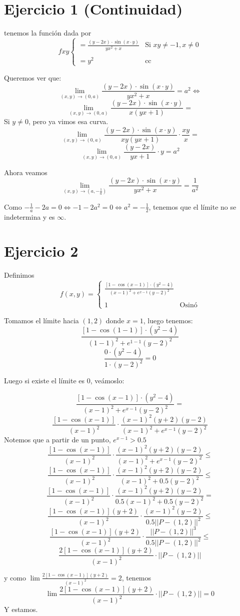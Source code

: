\documentclass{article}
\begin{document}
\section*{Ejercicio 1 (Continuidad)}
tenemos la función dada por
\[
	fxy
	\begin{cases}
		= \frac{(y-2x) \cdot \sin (x \cdot y)}{yx^2+x} &
		\text{Si $xy \neq -1, x \neq 0$}
		\\ \\
		= y^2 & \text{cc}
	\end{cases}
\]

Queremos ver que:
\[
	\lim_{(x, y) \to (0, a)} \frac{(y-2x) \cdot \sin (x \cdot y)}{yx^2+x}
	= a^2 \iff
\]
\[
	\lim_{(x, y) \to (0, a)} \frac{(y-2x) \cdot \sin (x \cdot y)}{x(yx+1)}
	=
\]
Si $y \neq 0$, pero ya vimos esa curva.
\[
	\lim_{(x, y) \to (0, a)} \frac{(y-2x) \cdot \sin (x \cdot y)}{xy(yx+1)}
	\cdot \frac{xy}{x} 
	=
\]
\[
	\lim_{(x, y) \to (0, a)} \frac{(y-2x)}{yx+1}
	\cdot y
	= a^2
\]

Ahora veamos
\[
	\lim_{(x, y) \to (a, -\frac{1}{a} )}
	\frac{(y-2x) \cdot \sin (x \cdot y)}{yx^2+x}
	= \frac{1}{a^2}
\]

Como $-\frac{1}{a} -2a = 0 \iff -1 - 2a^2 = 0 \iff a^2 = -\frac{1}{2}$, tenemos
que el límite no se indetermina y es $\infty$.

\section*{Ejercicio 2}
Definimos \[
	f(x,y) = 
	\begin{cases}
		\frac{[1-\cos(x-1)] \cdot (y^2 - 4)}{(x-1)^2 + e^{x-1}(y-2)^2} 
		\\ \\
		1 & \text{Osinó}
	\end{cases}
\]

Tomamos el límite hacia $(1, 2)$ donde $x = 1$, luego tenemos:
\[
	\frac{[1-\cos(1-1)] \cdot (y^2 - 4)}{(1-1)^2 + e^{1-1}(y-2)^2} 
\]
\[
	\frac{0 \cdot (y^2 - 4)}{1 \cdot (y-2)^2} = 0
\]

Luego si existe el límite es $0$, veámoslo:

\[
	\frac{[1-\cos(x-1)] \cdot (y^2 - 4)}{(x-1)^2 + e^{x-1}(y-2)^2} =
\]
\[
	\frac{[1-\cos(x-1)]}{(x-1)^2} \cdot \frac{(x-1)^2(y+2)(y-2)}{(x-1)^2
	+ e^{x-1}(y-2)^2}
\]
Notemos que a partir de un punto, $e^{x-1} > 0.5$
\[
	\frac{[1-\cos(x-1)]}{(x-1)^2} \cdot \frac{(x-1)^2(y+2)(y-2)}{(x-1)^2
	+ e^{x-1}(y-2)^2} \leq
\]
\[
	\frac{[1-\cos(x-1)]}{(x-1)^2} \cdot \frac{(x-1)^2(y+2)(y-2)}{(x-1)^2
	+ 0.5(y-2)^2} \leq
\]
\[
	\frac{[1-\cos(x-1)]}{(x-1)^2} \cdot \frac{(x-1)^2(y+2)(y-2)}{0.5(x-1)^2
	+ 0.5(y-2)^2} =
\]
\[
	\frac{[1-\cos(x-1)](y+2)}{(x-1)^2} \cdot \frac{(x-1)^2(y-2)}{0.5||P - (1,
	2)||^2} \leq
\]
\[
	\frac{[1-\cos(x-1)](y+2)}{(x-1)^2} \cdot \frac{||P - (1,2)||^3}{0.5||P - (1,
	2)||^2} \leq
\]
\[
	\frac{2[1-\cos(x-1)](y+2)}{(x-1)^2} \cdot ||P - (1,2)||
\]

y como $\lim\frac{2[1-\cos(x-1)](y+2)}{(x-1)^2} = 2$, tenemos
\[
	\lim \frac{2[1-\cos(x-1)](y+2)}{(x-1)^2} \cdot ||P - (1,2)|| = 0
\]
Y estamos.
\end{document}
